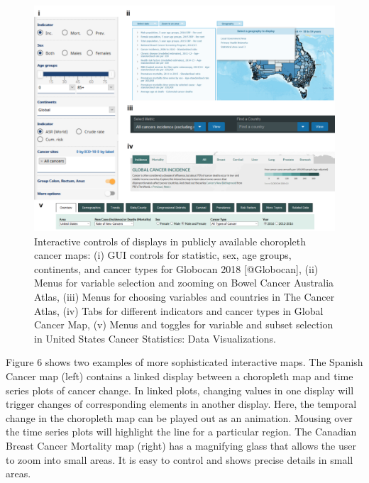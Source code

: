 \documentclass{monashthesis}
\begin{document}
\begin{figure}
\includegraphics[width=50in]{figures/02-literature/interacting} \caption{ Interactive controls of displays in publicly available choropleth cancer maps: (i) GUI controls for statistic, sex, age groups, continents, and cancer types for Globocan 2018 [@Globocan], (ii) Menus for variable selection and zooming on Bowel Cancer Australia Atlas, (iii) Menus for choosing variables and countries in The Cancer Atlas, (iv) Tabs for different indicators and cancer types in Global Cancer Map, (v) Menus and toggles for variable and subset selection in United States Cancer Statistics: Data Visualizations.}\label{fig:interacting}
\end{figure}

Figure 6 shows two examples of more sophisticated interactive maps. The Spanish Cancer map (left) contains a linked display between a choropleth map and time series plots of cancer change. In linked plots, changing values in one display will trigger changes of corresponding elements in another display. Here, the temporal change in the choropleth map can be played out as an animation. Mousing over the time series plots will highlight the line for a particular region. The Canadian Breast Cancer Mortality map (right) has a magnifying glass that allows the user to zoom into small areas. It is easy to control and shows precise details in small areas.

\begin{Shaded}
\begin{Highlighting}[]
\OperatorTok{::}\NormalTok{(}\NormalTok{)}
\end{Highlighting}
\end{Shaded}
\end{document}
